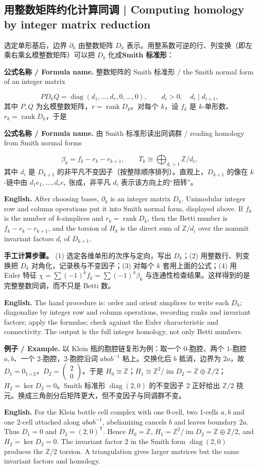 \documentclass[UTF8,11pt,a4paper]{ctexart}
\newcommand{\EN}[1]{\par\noindent\textbf{English.} #1\par}
\newcommand{\FORMULA}[2]{\par\noindent\textbf{公式名称 / Formula name.} #1 / #2\par}
\newcommand{\EX}[2]{\par\noindent\textbf{例子 / Example.} #1\par\EN{#2}}
\begin{document}
\subsection{用整数矩阵约化计算同调 | Computing homology by integer matrix reduction}
\noindent 选定单形基后，边界 $\partial_k$ 由整数矩阵 $D_k$ 表示。用整系数可逆的行、列变换（即左乘右乘幺模整数矩阵）可以把 $D_k$ 化成\textbf{Smith 标准形}：
\FORMULA{整数矩阵的 Smith 标准形}{the Smith normal form of an integer matrix}
\[
P D_k Q=\operatorname{diag}(d_1,\ldots,d_r,0,\ldots,0),
\qquad d_i>0,\quad d_i\mid d_{i+1},
\]
其中 $P,Q$ 为幺模整数矩阵，$r=\operatorname{rank}D_k$。对每个 $k$，设 $f_k$ 是 $k$-单形数、$r_k=\operatorname{rank}D_k$，于是
\FORMULA{由 Smith 标准形读出同调群}{reading homology from Smith normal forms}
\[
\beta_k=f_k-r_k-r_{k+1},
\qquad
T_k\cong\bigoplus_{d_i>1}\mathbb Z/d_i,
\]
其中 $d_i$ 是 $D_{k+1}$ 的非平凡不变因子（按整除顺序排列）。直观上，$D_{k+1}$ 的像在 $k$-链中由 $d_1 e_1,\ldots,d_r e_r$ 张成，非平凡 $d_i$ 表示该方向上的“扭转”。
\EN{After choosing bases, $\partial_k$ is an integer matrix $D_k$. Unimodular integer row and column operations put it into Smith normal form, displayed above. If $f_k$ is the number of $k$-simplices and $r_k=\operatorname{rank}D_k$, then the Betti number is $f_k-r_k-r_{k+1}$, and the torsion of $H_k$ is the direct sum of $\mathbb Z/d_i$ over the nonunit invariant factors $d_i$ of $D_{k+1}$.}

\noindent\textbf{手工计算步骤。} (1) 选定各维单形的次序与定向，写出 $D_k$；(2) 用整数行、列变换把 $D_k$ 对角化，记录秩与不变因子；(3) 对每个 $k$ 套用上面的公式；(4) 用 Euler 特征 $\chi=\sum(-1)^kf_k=\sum(-1)^k\beta_k$ 与连通性检查结果。这样得到的是完整整数同调，而不只是 Betti 数。
\EN{The hand procedure is: order and orient simplices to write each $D_k$; diagonalize by integer row and column operations, recording ranks and invariant factors; apply the formulas; check against the Euler characteristic and connectivity. The output is the full integer homology, not only Betti numbers.}

\EX{以 Klein 瓶的胞腔链复形为例：取一个 $0$-胞腔、两个 $1$-胞腔 $a,b$、一个 $2$-胞腔，$2$-胞腔沿词 $abab^{-1}$ 粘上。交换化后 $b$ 抵消，边界为 $2a$，故 $D_1=0_{1\times2}$，$D_2=\begin{pmatrix}2\\0\end{pmatrix}$。于是 $H_0\cong\mathbb Z$；$H_1\cong\mathbb Z^2/\operatorname{im}D_2=\mathbb Z\oplus\mathbb Z/2$；$H_2=\ker D_2=0$。Smith 标准形 $\operatorname{diag}(2,0)$ 的不变因子 $2$ 正好给出 $\mathbb Z/2$ 挠元。换成三角剖分后矩阵更大，但不变因子与同调群不变。}{For the Klein bottle cell complex with one 0-cell, two 1-cells $a,b$ and one 2-cell attached along $abab^{-1}$, abelianizing cancels $b$ and leaves boundary $2a$. Thus $D_1=0$ and $D_2=(2,0)^{\mathsf T}$. Hence $H_0=\mathbb Z$, $H_1=\mathbb Z^2/\operatorname{im}D_2=\mathbb Z\oplus\mathbb Z/2$, and $H_2=\ker D_2=0$. The invariant factor $2$ in the Smith form $\operatorname{diag}(2,0)$ produces the $\mathbb Z/2$ torsion. A triangulation gives larger matrices but the same invariant factors and homology.}
\end{document}
